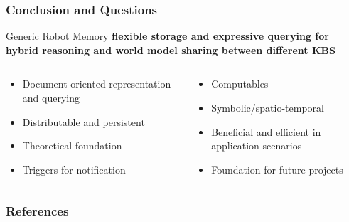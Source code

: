 \begin{frame}
  \frametitle{Conclusion and Questions}
  \begin{block}{Generic Robot Memory } \centering\bfseries
    flexible storage and expressive querying for hybrid reasoning and world model sharing between different KBS
  \end{block}
  \bigskip
  \begin{columns}
    \begin{column}{0.5\textwidth}
      \begin{itemize}
      \item Document-oriented representation and querying
      \item Distributable and persistent
      \item Theoretical foundation
      \item Triggers for notification
      \end{itemize}
    \end{column}
    \begin{column}{0.5\textwidth}
      \begin{itemize}
      \item Computables
      \item Symbolic/spatio-temporal
      \item Beneficial and efficient in application scenarios
      \item Foundation for future projects
      \end{itemize}
    \end{column}
  \end{columns}
\end{frame}




\setcounter{finalframe}{\value{framenumber}}


\begin{frame}[allowframebreaks]
  \frametitle{References}
  \small
  
  
\end{frame}

